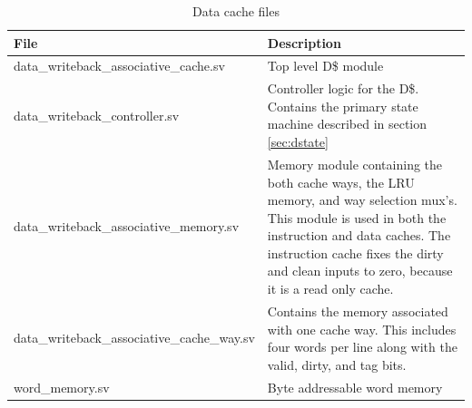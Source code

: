 	\begin{table}
	\begin{tabular}{|l|p{70mm}|}
	\hline File  & Description \\ 
	\hline  data\_writeback\_associative\_cache.sv & Top level D\$ module \\ 
	\hline  data\_writeback\_controller.sv & Controller logic for the D\$.
	Contains the primary state machine described in section \ref{sec:dstate} \\ 
	\hline  data\_writeback\_associative\_memory.sv & 
	Memory module containing the both cache ways, the LRU memory, and way selection mux's.
	This module is used in both the instruction and data caches.
	The instruction cache fixes the dirty and clean inputs to zero, because it is a read only cache.\\ 
	\hline  data\_writeback\_associative\_cache\_way.sv & 
	Contains the memory associated with one cache way. This includes four words per line along with the valid, dirty, and tag bits. \\ 
	\hline  word\_memory.sv & Byte addressable word memory  \\
	\hline
	\end{tabular} 
	\caption{Data cache files}
	\label{table:drel}
	\end{table}

